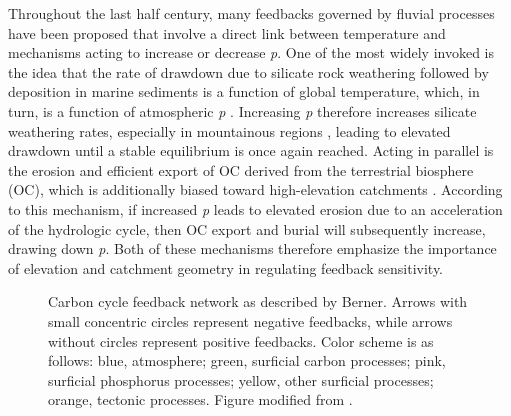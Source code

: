 Throughout the last half century, many feedbacks governed by fluvial processes have been proposed that involve a direct link between temperature and mechanisms acting to increase or decrease \textit{p}. One of the most widely invoked is the idea that the rate of  drawdown due to silicate rock weathering followed by  deposition in marine sediments is a function of global temperature, which, in turn, is a function of atmospheric \textit{p} \citep[\textit{e.g.}][]{Goldschmidt:1933tg,Rubey:1951ha,Walker:1981wn}. Increasing \textit{p} therefore increases silicate weathering rates, especially in mountainous regions \citep{Maher:2014kq}, leading to elevated  drawdown until a stable equilibrium is once again reached. Acting in parallel is the erosion and efficient export of OC derived from the terrestrial biosphere (OC), which is additionally biased toward high-elevation catchments \citep{FranceLanord:1997ua,Galy:2007ev,Hilton:2008fo,Galy:2015fx}. According to this mechanism, if increased \textit{p} leads to elevated erosion due to an acceleration of the hydrologic cycle, then OC export and burial will subsequently increase, drawing down \textit{p}. Both of these mechanisms therefore emphasize the importance of elevation and catchment geometry in regulating feedback sensitivity.

\begin{figure}[h]
	\caption[Carbon cycle feedback network \textit{a la} Berner]{Carbon cycle feedback network as described by Berner. Arrows with small concentric circles represent negative feedbacks, while arrows without circles represent positive feedbacks. Color scheme is as follows: blue, atmosphere; green, surficial carbon processes; pink, surficial phosphorus processes; yellow, other surficial processes; orange, tectonic processes. Figure modified from \citet{Berner:1999wj}.}
	\label{Ch7Fig:1}
\end{figure}

